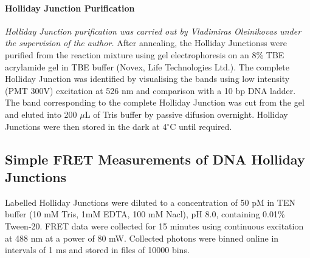 \paragraph{Holliday Junction Purification}
\emph{Holliday Junction purification was carried out by \mbox{Vladimiras} Oleinikovas under the supervision of the author.}
After annealing, the Holliday Junctionss were purified from the reaction mixture using gel electrophoresis on an 8\% TBE acrylamide gel in TBE buffer (Novex, Life Technologies Ltd.). The complete Holliday Junction was identified by visualising the bands using low intensity (PMT 300V) excitation at 526 nm and comparison with a 10 bp DNA ladder. The band corresponding to the complete Holliday Junction was cut from the gel and eluted into 200 $\mu$L of Tris buffer by passive difusion overnight. Holliday Junctions were then stored in the dark at 4$^{\circ}$C until required.

\subsection{Simple FRET Measurements of DNA Holliday Junctions}
Labelled Holliday Junctions were diluted to a concentration of 50 pM in TEN buffer (10 mM Tris, 1mM EDTA, 100 mM Nacl), pH 8.0, containing 0.01\% Tween-20. FRET data were collected for 15 minutes using continuous excitation at 488 nm at a power of 80 mW. Collected photons were binned online in intervals of 1 ms and stored in files of 10000 bins. 


